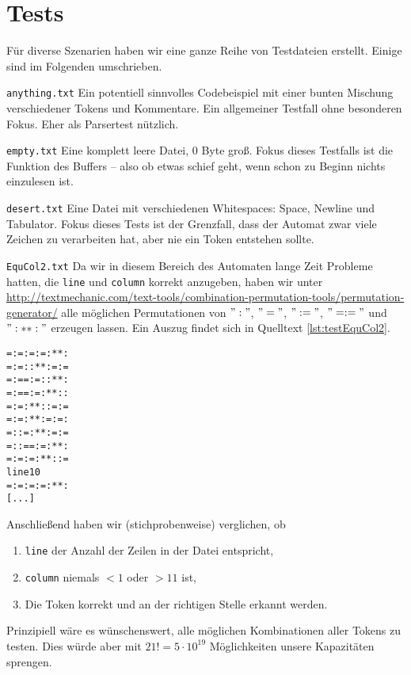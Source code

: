 \documentclass[
a4paper,   %
11pt,      %
oneside,   %
onecolumn, %
final      %
]{article}
\newcommand{\code}[1]{\lstinline$#1$}
\begin{document}
\section{Tests}
Für diverse Szenarien haben wir eine ganze Reihe von Testdateien erstellt. Einige sind im Folgenden umschrieben.

\begin{description}
\item{\texttt{anything.txt}} Ein potentiell sinnvolles Codebeispiel mit einer bunten Mischung verschiedener Tokens und Kommentare. Ein allgemeiner Testfall ohne besonderen Fokus. Eher als Parsertest nützlich.

\item{\texttt{empty.txt}} Eine komplett leere Datei, 0 Byte groß. Fokus dieses Testfalls ist die Funktion des Buffers -- also ob etwas schief geht, wenn schon zu Beginn nichts einzulesen ist.

\item{\texttt{desert.txt}} Eine Datei mit verschiedenen Whitespaces: Space, Newline und Tabulator. Fokus dieses Tests ist der Grenzfall, dass der Automat zwar viele Zeichen zu verarbeiten hat, aber nie ein Token entstehen sollte.

\item{\texttt{EquCol2.txt}} Da wir in diesem Bereich des Automaten lange Zeit Probleme hatten, die \code{line} und \code{column} korrekt anzugeben, haben wir unter \url{http://textmechanic.com/text-tools/combination-permutation-tools/permutation-generator/} alle möglichen Permutationen von $":"$, $"="$, $":="$, $"=:="$ und $":**:"$ erzeugen lassen. Ein Auszug findet sich in Quelltext \ref{lst:testEquCol2}.
\begin{lstlisting}[language=SysProgLang, caption={EquCol2.txt}, label=lst:testEquCol2]
=:=:=:=:**:
=:=::**:=:=
=:==:=::**:
=:==:=:**::
=:=:**::=:=
=:=:**:=:=:
=::=:**:=:=
=::==:=:**:
=:=:=:**::=
line10
=:=:=:=:**:
[...]
\end{lstlisting}
Anschließend haben wir (stichprobenweise) verglichen, ob
\begin{enumerate}
\item \code{line} der Anzahl der Zeilen in der Datei entspricht,
\item \code{column} niemals $< 1$ oder $> 11$ ist,
\item Die Token korrekt und an der richtigen Stelle erkannt werden.
\end{enumerate}
Prinzipiell wäre es wünschenswert, alle möglichen Kombinationen aller Tokens zu testen. Dies würde aber mit $21! = 5 \cdot 10^{19}$ Möglichkeiten unsere Kapazitäten sprengen.


\end{description}
\end{document}
